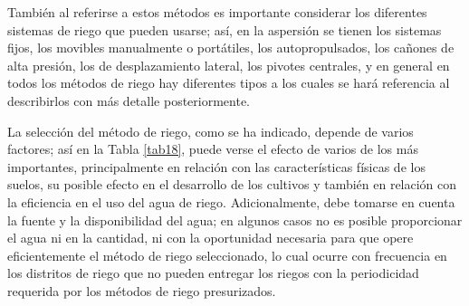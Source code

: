 \begin{table}[h!]
	\caption{Factores que afectan la selección del método de riego}
	\label{tab18}
\end{table}
También al referirse a estos métodos es importante considerar los diferentes
sistemas de riego que pueden usarse; así, en la aspersión se tienen los sistemas fijos,
los movibles manualmente o portátiles, los autopropulsados, los cañones de alta
presión, los de desplazamiento lateral, los pivotes centrales, y en general en todos los
métodos de riego hay diferentes tipos a los cuales se hará referencia al describirlos con
más detalle posteriormente.

La selección del método de riego, como se ha indicado, depende de varios
factores; así en la Tabla \ref{tab18}, puede verse el efecto de varios de los más importantes,
principalmente en relación con las características físicas de los suelos, su posible efecto
en el desarrollo de los cultivos y también en relación con la eficiencia en el uso del agua
de riego. Adicionalmente, debe tomarse en cuenta la fuente y la disponibilidad del agua;
en algunos casos no es posible proporcionar el agua ni en la cantidad, ni con la
oportunidad necesaria para que opere eficientemente el método de riego seleccionado,
lo cual ocurre con frecuencia en los distritos de riego que no pueden entregar los riegos
con la periodicidad requerida por los métodos de riego presurizados.

